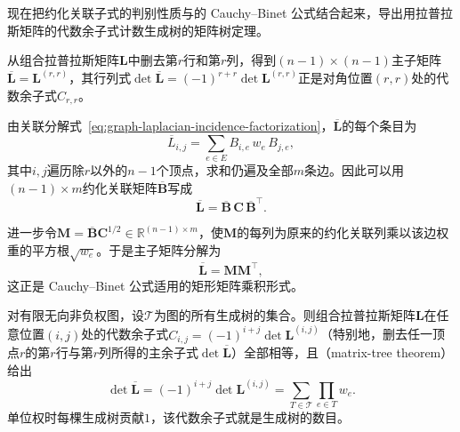 现在把约化关联子式的判别性质与的 Cauchy--Binet 公式结合起来，导出用拉普拉斯矩阵的代数余子式计数生成树的矩阵树定理。

从组合拉普拉斯矩阵$\bm L$中删去第$r$行和第$r$列，得到$(n-1)\times(n-1)$主子矩阵$\overline{\bm L}=\bm L^{(r,r)}$，其行列式$\det\overline{\bm L}=(-1)^{r+r}\det\bm L^{(r,r)}$正是对角位置$(r,r)$处的代数余子式$C_{r,r}$。

由关联分解式~\eqref{eq:graph-laplacian-incidence-factorization}，$\overline{\bm L}$的每个条目为
\[
  \overline L_{i,j}=\sum_{e\in E} B_{i,e}\,w_e\,B_{j,e},
\]
其中$i,j$遍历除$r$以外的$n-1$个顶点，求和仍遍及全部$m$条边。因此可以用$(n-1)\times m$约化关联矩阵$\overline{\bm B}$写成
\[
  \overline{\bm L}=\overline{\bm B}\,\bm C\,\overline{\bm B}^\top.
\]

进一步令$\bm M=\overline{\bm B}\bm C^{1/2}\in\mathbb R^{(n-1)\times m}$，使$\bm M$的每列为原来的约化关联列乘以该边权重的平方根$\sqrt{w_e}$。于是主子矩阵分解为
\[
  \overline{\bm L}=\bm M\bm M^\top,
\]
这正是 Cauchy--Binet 公式适用的矩形矩阵乘积形式。

\begin{theorem}[矩阵树定理]
\label{thm:graph-matrix-tree}
对有限无向非负权图，设$\mathcal T$为图的所有生成树的集合。则组合拉普拉斯矩阵$\bm L$在任意位置$(i,j)$处的代数余子式$C_{i,j}=(-1)^{i+j}\det\bm L^{(i,j)}$（特别地，删去任一顶点$r$的第$r$行与第$r$列所得的主余子式$\det\overline{\bm L}$）全部相等，且（matrix-tree theorem）给出
\begin{equation}
  \det \overline{\bm L}=(-1)^{i+j}\det\bm L^{(i,j)}=\sum_{T\in\mathcal T}\prod_{e\in T}w_e.
  \label{eq:graph-matrix-tree}
\end{equation}
单位权时每棵生成树贡献$1$，该代数余子式就是生成树的数目。
\end{theorem}

